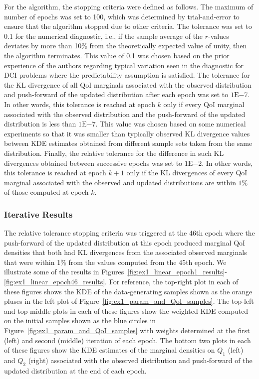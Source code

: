 \documentclass{article}
\newcommand{\expnumber}[2]{{#1}\mathrm{E}{#2}}
\begin{document}
For the algorithm, the stopping criteria were defined as follows.
The maximum of number of epochs was set to 100, which was determined by trial-and-error to ensure that the algorithm stopped due to other criteria.
The tolerance was set to 0.1 for the numerical diagnostic, i.e., if the sample average of the $r$-values deviates by more than 10\% from the theoretically expected value of unity, then the algorithm terminates.
This value of 0.1 was chosen based on the prior experience of the authors regarding typical variation seen in the diagnostic for DCI problems where the predictability assumption is satisfied. 
The tolerance for the KL divergence of all QoI marginals associated with the observed distribution and push-forward of the updated distribution after each epoch was set to $\expnumber{1}{-7}$.
In other words, this tolerance is reached at epoch $k$ only if every QoI marginal associated with the observed distribution and the push-forward of the updated distribution is less than $\expnumber{1}{-7}$.
This value was chosen based on some numerical experiments so that it was smaller than typically observed KL divergence values between KDE estimates obtained from different sample sets taken from the same distribution. 
Finally, the relative tolerance for the difference in such KL divergences obtained between successive epochs was set to $\expnumber{1}{-2}$. 
In other words, this tolerance is reached at epoch $k+1$ only if the KL divergences of every QoI marginal associated with the observed and updated distributions are within $1\%$ of those computed at epoch $k$.


\subsubsection{Iterative Results}

The relative tolerance stopping criteria was triggered at the 46th epoch where the push-forward of the updated distribution at this epoch produced marginal QoI densities that both had KL divergences from the associated observed marginals that were within 1\% from the values computed from the 45th epoch. 
We illustrate some of the results in Figures~\ref{fig:ex1_linear_epoch1_results}-\ref{fig:ex1_linear_epoch46_results}.
For reference, the top-right plot in each of these figures shows the KDE of the data-generating samples shown as the orange pluses in the left plot of Figure~\ref{fig:ex1_param_and_QoI_samples}.
The top-left and top-middle plots in each of these figures show the weighted KDE computed on the initial samples shown as the blue circles in Figure~\ref{fig:ex1_param_and_QoI_samples} with weights determined at the first (left) and second (middle) iteration of each epoch.
The bottom two plots in each of these figures show the KDE estimates of the marginal densities on $Q_1$ (left) and $Q_2$ (right) associated with the observed distribution and push-forward of the updated distribution at the end of each epoch.
\end{document}
